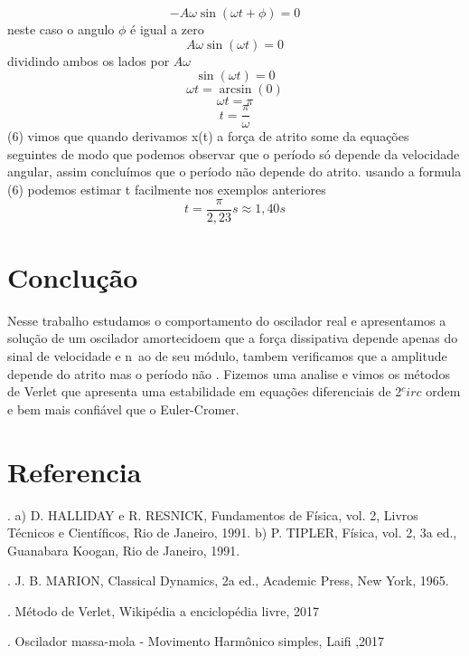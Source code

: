 \documentclass[a4paper]{article} %
\begin{document}
\[-A\omega\sin(\omega{t} + \phi)  = 0\]
neste caso o angulo $\phi$ \'e igual a zero
\[A\omega\sin(\omega{t})  = 0\]
dividindo ambos os lados por $A\omega$
\[\sin(\omega{t}) = 0\]
\[\omega{t} = \arcsin(0)\]
\[\omega{t} = \pi\]
\[t = \frac{\pi}{\omega}\](6)
vimos que quando derivamos x(t) a for\c{c}a de atrito some da equa\c{c}\~oes seguintes de modo que podemos observar que o per\'iodo s\'o depende da velocidade angular, assim conclu\'imos que o per\'iodo n\~ao depende do atrito.
usando a formula (6) podemos estimar t facilmente nos exemplos anteriores
\[t = \frac{\pi}{2,23}s \approx 1,40s\]    
 
 
\section{Conclu\c{c}\~ao}

Nesse trabalho estudamos o comportamento do oscilador real e apresentamos a solu\c{c}\~ao de um oscilador amortecidoem que a for\c{c}a dissipativa depende apenas do sinal de velocidade e n~ao de seu m\'odulo, tambem verificamos que a amplitude depende do atrito mas o per\'iodo não . Fizemos uma analise e vimos os m\'etodos de Verlet que apresenta uma estabilidade em equa\c{c}\~oes diferenciais de 2$^circ$ ordem e bem mais confi\'avel que o Euler-Cromer.

\section{Referencia}

\noindent 
{}. a) D. HALLIDAY e R. RESNICK, Fundamentos de F\'isica, vol. 2, Livros T\'ecnicos e Cient\'ificos, Rio de Janeiro, 1991. b) P. TIPLER, F\'isica, vol. 2, 3a ed., Guanabara Koogan, Rio de Janeiro, 1991.

. J. B. MARION, Classical Dynamics, 2a ed., Academic Press, New York, 1965.

. M\'etodo de Verlet, Wikip\'edia a enciclop\'edia livre, 2017

. Oscilador massa-mola - Movimento Harm\^{o}nico simples, Laifi ,2017
\end{document}
